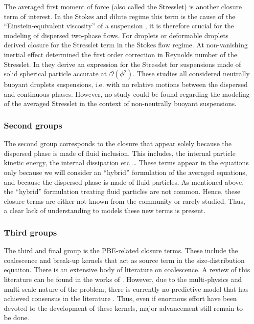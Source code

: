 The averaged first moment of force (also called the Stresslet) is another closure term of interest.
In the Stokes and dilute regime this term is the cause of the ``Einstein-equivalent viscosity''  of a suspension \citep{guazzelli2011}, it is therefore crucial for the modeling of dispersed two-phase flows. 
For droplets or deformable droplets \citet{nadim1996concise} derived closure for the Stresslet term in the Stokes flow regime.  
At non-vanishing inertial effect \citet{raja2010inertial} determined the first order correction in Reynolds number of the Stresslet. 
In \citet{batchelor1972hydrodynamic,hinch1977averaged} they derive an expression for the Stresslet for suspensions made of solid spherical particle accurate at $\mathcal{O}(\phi^2)$.
These studies all considered neutrally buoyant droplets suspensions, i.e. with no relative motions between the dispersed and continuous phases. 
However, no study could be found regarding the modeling of the averaged Stresslet in the context of non-neutrally buoyant suspensions. %

\subsubsection{Second groups}


The second group corresponds to the closure that appear solely because the dispersed phase is made of fluid inclusion. 
This includes, the internal particle kinetic energy, the internal dissipation etc \ldots
These terms appear in the equations only because we will consider an ``hybrid'' formulation of the averaged equations, and because the dispersed phase is made of fluid particles. 
As mentioned above, the ``hybrid'' formulation treating fluid particles are not common. 
Hence, these closure terms are either not known from the community or rarely studied. 
Thus, a clear lack of understanding to models these new terms is present.  

\subsubsection{Third groups}

The third and final group is the PBE-related closure terms. 
These include the coalescence and break-up kernels that act as source term in the size-distribution equaiton. 
There is an extensive body of literature on coalescence. 
A review of this literature can be found in the works of \citet{chesters1991modelling}. 
However, due to the multi-physics and multi-scale nature of the problem, there is currently no predictive model that has achieved consensus in the literature \citep{liao2010literature}. 
Thus, even if enormous effort have been devoted to the development of these kernels, major advancement still remain to be done. 



